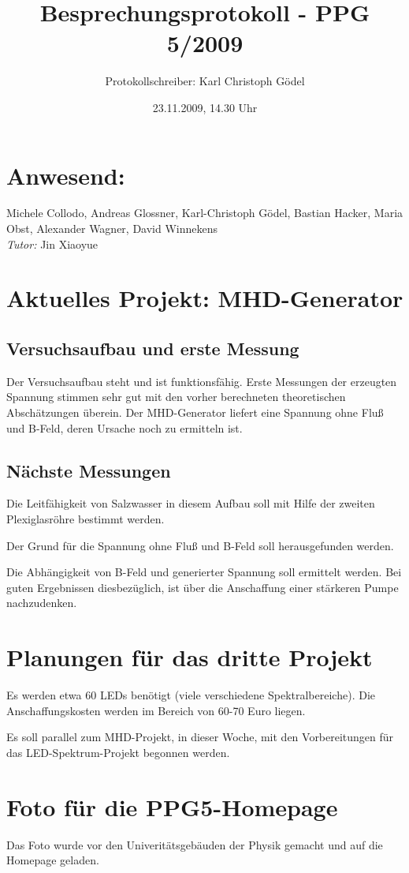 \documentclass[11pt]{scrartcl}
\title{Besprechungsprotokoll - PPG 5/2009}
\date{23.11.2009, 14.30 Uhr}
\author{Protokollschreiber: Karl Christoph Gödel}
\begin{document}
\maketitle
\pagestyle{empty}
\section{Anwesend:} Michele Collodo, Andreas Glossner, Karl-Christoph G\"odel, Bastian Hacker, Maria Obst, Alexander Wagner, David Winnekens \\ \emph{Tutor:} Jin Xiaoyue 


\section{Aktuelles Projekt: MHD-Generator}
\subsection{Versuchsaufbau und erste Messung}
Der Versuchsaufbau steht und ist funktionsfähig. Erste Messungen der erzeugten Spannung stimmen sehr gut mit den vorher berechneten theoretischen Abschätzungen überein. Der MHD-Generator liefert eine Spannung ohne Fluß und B-Feld, deren Ursache noch zu ermitteln ist.

\subsection{Nächste Messungen}
Die Leitf\"ahigkeit von Salzwasser in diesem Aufbau soll mit Hilfe der zweiten Plexiglasröhre bestimmt werden.

Der Grund für die Spannung ohne Fluß und B-Feld soll herausgefunden werden.

Die Abhängigkeit von B-Feld und generierter Spannung soll ermittelt werden. Bei guten Ergebnissen diesbezüglich, ist über die Anschaffung einer stärkeren Pumpe nachzudenken.

\section{Planungen f\"ur das dritte Projekt}
Es werden etwa 60 LEDs benötigt (viele verschiedene Spektralbereiche). Die Anschaffungskosten werden im Bereich von 60-70 Euro liegen.

Es soll parallel zum MHD-Projekt, in dieser Woche, mit den Vorbereitungen für das LED-Spektrum-Projekt begonnen werden.

\section{Foto für die PPG5-Homepage}
Das Foto wurde vor den Univeritätsgebäuden der Physik gemacht und auf die Homepage geladen.
\end{document}
